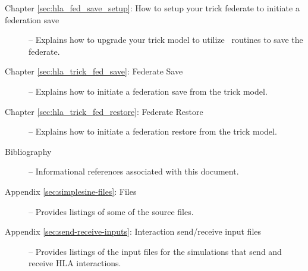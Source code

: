 \begin{description}
\item[Chapter \ref{sec:hla_fed_save_setup}: How to setup your trick federate to
initiate a federation save] --
Explains how to upgrade your trick model to utilize \TrickHLA\ routines to save
the federate.

\item[Chapter \ref{sec:hla_trick_fed_save}: Federate Save] --
Explains how to initiate a federation save from the trick model.

\item[Chapter \ref{sec:hla_trick_fed_restore}: Federate Restore] --
Explains how to initiate a federation restore from the trick model.

\item[Bibliography] --
Informational references associated with this document.

\item[Appendix \ref{sec:simplesine-files}: \simplesine Files] --
Provides listings of some of the \simplesine source files.

\item[Appendix \ref{sec:send-receive-inputs}: Interaction send/receive input files] --
Provides listings of the input files for the simulations that
send and receive HLA interactions.

\end{description}
